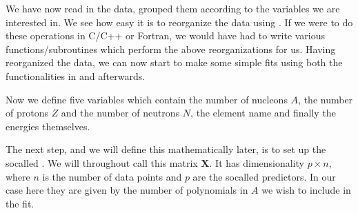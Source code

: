 \documentclass[letterpaper,10pt,english]{sphinxmanual}
\begin{document}
We have now read in the data, grouped them according to the variables we are interested in.
We see how easy it is to reorganize the data using . If we
were to do these operations in C/C++ or Fortran, we would have had to
write various functions/subroutines which perform the above
reorganizations for us.  Having reorganized the data, we can now start
to make some simple fits using both the functionalities in  and
 afterwards.

Now we define five variables which contain
the number of nucleons \(A\), the number of protons \(Z\) and the number of neutrons \(N\), the element name and finally the energies themselves.

\begin{sphinxVerbatim}[commandchars=\\\{\}]
  \PYG{p}{[}\PYG{p}{]}
  \PYG{p}{[}\PYG{p}{]}
  \PYG{p}{[}\PYG{p}{]}
  \PYG{p}{[}\PYG{p}{]}
  \PYG{p}{[}\PYG{p}{]}
\end{sphinxVerbatim}

The next step, and we will define this mathematically later, is to set up the so\sphinxhyphen{}called . We will throughout call this matrix \(\boldsymbol{X}\).
It has dimensionality \(p\times n\), where \(n\) is the number of data points and \(p\) are the so\sphinxhyphen{}called predictors. In our case here they are given by the number of polynomials in \(A\) we wish to include in the fit.

\begin{sphinxVerbatim}[commandchars=\\\{\}]
  
\PYG{p}{[}\PYG{p}{]}  
\PYG{p}{[}\PYG{p}{]}  
\PYG{p}{[}\PYG{p}{]}  
\PYG{p}{[}\PYG{p}{]}  
\PYG{p}{[}\PYG{p}{]}  
\end{sphinxVerbatim}
\end{document}
